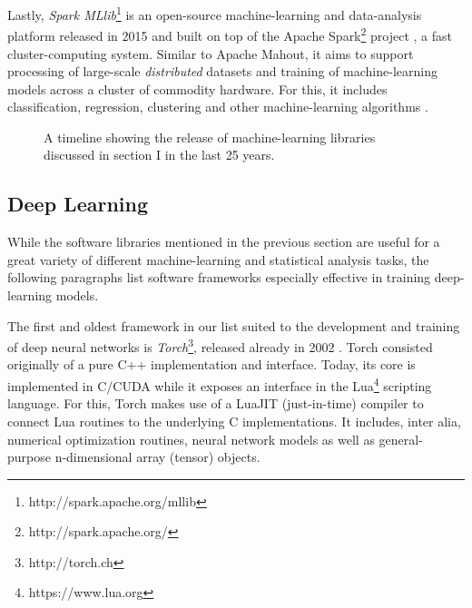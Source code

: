 Lastly, \emph{Spark MLlib}\footnote{http://spark.apache.org/mllib} is an
open-source machine-learning and data-analysis platform released in 2015 and
built on top of the Apache Spark\footnote{http://spark.apache.org/} project
\cite{spark}, a fast cluster-computing system. Similar to Apache Mahout, it aims
to support processing of large-scale \emph{distributed} datasets and training of
machine-learning models across a cluster of commodity hardware. For this, it
includes classification, regression, clustering and other machine-learning
algorithms \cite{mllib}.

\begin{figure*}[t!]
\centering
\label{fig:timeline}
\caption{A timeline showing the release of machine-learning libraries discussed
  in section I in the last 25 years.}
\end{figure*}

\subsection{Deep Learning}\label{sec:history-dl}

While the software libraries mentioned in the previous section are useful for a
great variety of different machine-learning and statistical analysis tasks, the
following paragraphs list software frameworks especially effective in training
deep-learning models.

The first and oldest framework in our list suited to the development and
training of deep neural networks is \emph{Torch}\footnote{http://torch.ch},
released already in 2002 \cite{torch}. Torch consisted originally of a pure C++
implementation and interface. Today, its core is implemented in C/CUDA while it
exposes an interface in the Lua\footnote{https://www.lua.org} scripting
language. For this, Torch makes use of a LuaJIT (just-in-time) compiler to
connect Lua routines to the underlying C implementations. It includes, inter
alia, numerical optimization routines, neural network models as well as
general-purpose n-dimensional array (tensor) objects.

